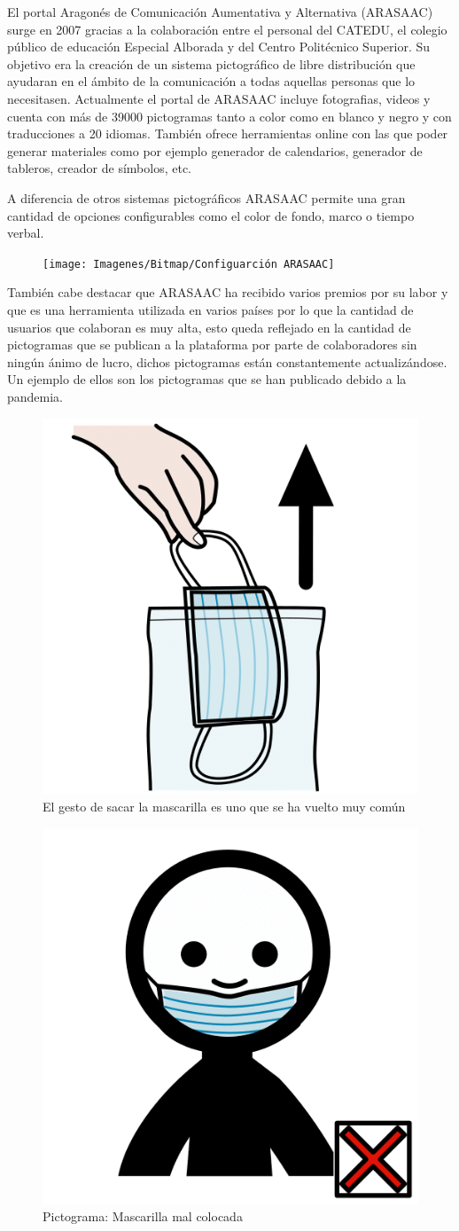 El portal Aragonés de Comunicación Aumentativa y Alternativa (ARASAAC) surge en 2007 gracias a la colaboración entre el personal del CATEDU, el colegio público de educación Especial Alborada y del Centro Politécnico Superior. Su objetivo era la creación de un sistema pictográfico de libre distribución que ayudaran en el ámbito de la comunicación a todas aquellas personas que lo necesitasen.
Actualmente el portal de ARASAAC incluye fotografias, videos y cuenta con más de 39000 pictogramas tanto a color como en blanco y negro y con traducciones a 20 idiomas. También ofrece herramientas online con las que poder generar materiales como por ejemplo generador de calendarios, generador de tableros, creador de símbolos, etc.

A diferencia de otros sistemas pictográficos ARASAAC permite una gran cantidad de opciones configurables como el color de fondo, marco o tiempo verbal.


\begin{figure}[h!]
	\centering
	\texttt{[image: Imagenes/Bitmap/Configuarción ARASAAC]}
	\caption{}
	\label{fig:configuarcion-arasaac}
\end{figure}



También cabe destacar que ARASAAC ha recibido varios premios por su labor y que es una herramienta utilizada en varios países por lo que la cantidad de usuarios que colaboran es muy alta, esto queda reflejado en la cantidad de pictogramas que se publican a la plataforma por parte de colaboradores sin ningún ánimo de lucro, dichos pictogramas están constantemente actualizándose. Un ejemplo de ellos son los pictogramas que se han publicado debido a la pandemia.

\begin{figure}[h!]
	\centering
	\includegraphics[width=0.2\linewidth]{Imagenes/Bitmap/Picto Mascarilla}
	\caption{El gesto de sacar la mascarilla es uno que se ha vuelto muy común}
	\label{fig:picto-mascarilla}
\end{figure}

\begin{figure}[h!]
	\centering
	\includegraphics[width=0.2\linewidth]{Imagenes/Bitmap/Mascarilla mal colocada}
	\caption{Pictograma: Mascarilla mal colocada}
	\label{fig:picto-mascarilla-mal-colocada}
\end{figure}

